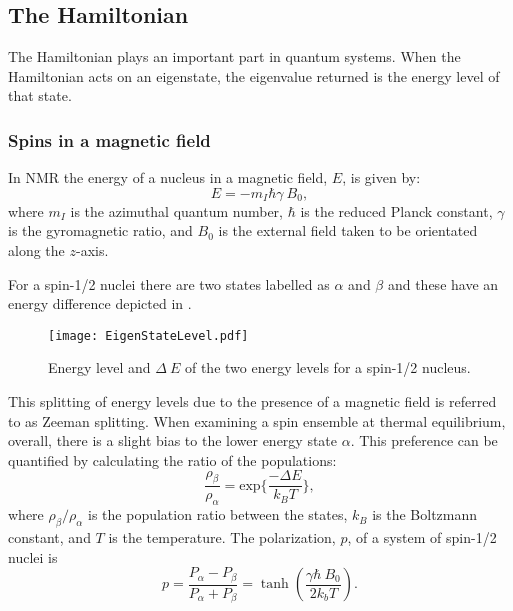 \subsection{The Hamiltonian}\label{Hamiltonian}

The Hamiltonian plays an important part in quantum systems. When the Hamiltonian acts on an eigenstate,
the eigenvalue returned is the energy level of that state.

\subsubsection{Spins in a magnetic field}\label{EnergyLevels}

In NMR the energy of a nucleus in a magnetic field, $E$, is given by:
\begin{equation}
  E = -m_I\hbar\gamma~B_0,
\end{equation}
where $m_I$ is the azimuthal quantum number, $\hbar$ is the reduced Planck constant, $\gamma$
is the gyromagnetic ratio, and $B_0$ is the external field taken to be orientated along the $z$-axis.

For a spin-1/2 nuclei there are two states labelled as $\alpha$ and $\beta$
and these have an energy difference depicted in .

\begin{figure}[ht]
  \begin{center}
  \texttt{[image: EigenStateLevel.pdf]}
  \end{center}
  \caption{Energy level and $\Delta~E$ of the two energy levels for a spin-1/2 nucleus.}
  \label{fig:EnergySplit}
\end{figure}

This splitting of energy levels due to the presence of a magnetic field is referred to as Zeeman splitting.
When examining a spin ensemble at thermal equilibrium, overall, there is a slight bias to the lower energy
state $\alpha$. This preference can be quantified by calculating the ratio of the populations:
\begin{equation}\label{eqn:Boltzmann}
  \frac{\rho_{\beta}}{\rho_{\alpha}} = \text{exp}\{\frac{-\Delta{E}}{k_B T}\},
\end{equation}
where $\rho_{\beta}/\rho_{\alpha}$ is the population ratio between the states, $k_B$ is the Boltzmann constant, and $T$ is the temperature. The polarization, $p$, of a system of
spin-1/2 nuclei is
\begin{equation}\label{eqn:Polarization}
  p = \frac{P_\alpha - P_\beta}{P_\alpha + P_\beta} = \tanh(\frac{\gamma\hbar~B_0}{2k_bT}).
\end{equation}

